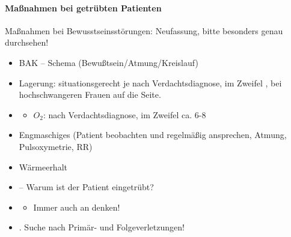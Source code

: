 \begin{gMassnahmenEnv}
    \paragraph{Ma{\ss}nahmen bei getr\"ubten Patienten}

    Ma{\ss}nahmen bei Bewusstseinsst\"orungen: Neufassung, bitte besonders
    genau durchsehen!%

    \begin{itemize}
        \item BAK -- Schema  (Bewu{\ss}tsein/Atmung/Kreislauf)
        \item Lagerung: situationsgerecht je nach
        Verdachtsdiagnose, im Zweifel , bei hochschwangeren Frauen auf die
         Seite.
        \item \gTxBeiVit \gTxMassVitBes

        \begin{itemize}
            \item $O_2$: nach Verdachtsdiagnose, im Zweifel
            ca. 6-8\gLMin
        \end{itemize}

        \item Engmaschiges  (Patient
        beobachten und regelmäßig ansprechen, Atmung,
        Pulsoxymetrie, RR)
        \item W\"armeerhalt
        \item {} -- Warum ist der
        Patient eingetr\"ubt?
        \item {}
        \begin{itemize}
            \item Immer auch an  denken!
        \end{itemize}
        \item {}. Suche nach Primär- und
        Folgeverletzungen!
    \end{itemize}

\end{gMassnahmenEnv}

